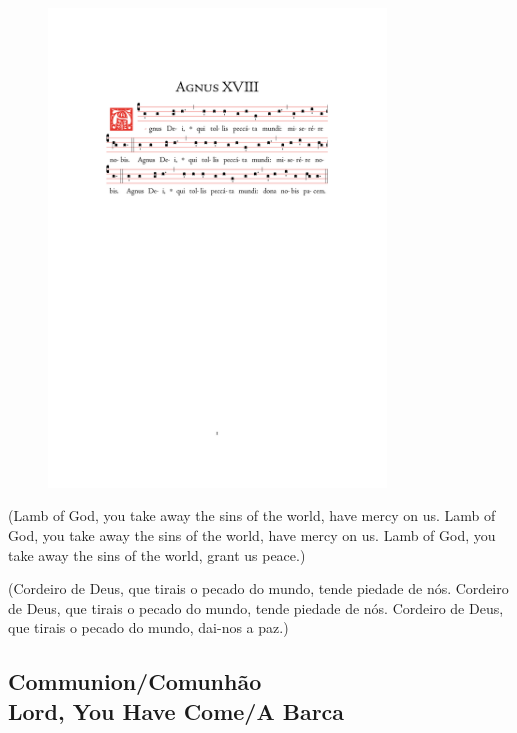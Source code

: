 \documentclass[10pt,a4]{article}
\begin{document}
\begin{figure}[h!]
	\centering
	\includegraphics[trim = 35mm 175mm 25.5mm 45mm, clip, width = 0.8\textwidth]{scores/Agnus-XVIII.pdf}
\end{figure}

\begin{paracol}{2}

(Lamb of God, you take away the sins of the world, have mercy on us.
Lamb of God, you take away the sins of the world, have mercy on us.
Lamb of God, you take away the sins of the world, grant us peace.)\\

\switchcolumn

(Cordeiro de Deus, que tirais o pecado do mundo, tende piedade de nós.
Cordeiro de Deus, que tirais o pecado do mundo, tende piedade de nós.
Cordeiro de Deus, que tirais o pecado do mundo, dai-nos a paz.)\\

\switchcolumn*

\end{paracol}

\clearpage

\begin{center}
\subsection*{Communion/Comunh\~ao \\ Lord, You Have Come/A Barca}
\end{center}
\end{document}
